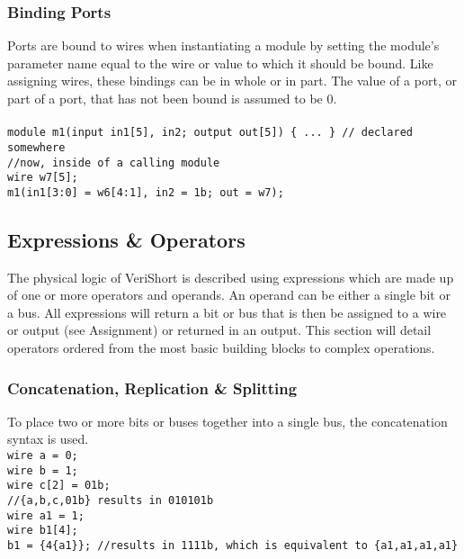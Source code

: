 \documentclass[letterpaper,11pt]{article}
\begin{document}
        \subsubsection{Binding Ports}
        Ports are bound to wires when instantiating a module by setting the module’s parameter name 
        equal to the wire or value to which it should be bound. Like assigning wires, these bindings 
        can be in whole or in part. The value of a port, or part of a port, that has not been bound 
        is assumed to be 0. \\\\
        \texttt{module m1(input in1[5], in2; output out[5]) \{ ... \} // declared somewhere} \\
        \texttt{\slash\slash now, inside of a calling module} \\
        \texttt{wire w7[5];} \\
        \texttt{m1(in1[3:0] = w6[4:1], in2 = 1b; out = w7);}
    
    \subsection{Expressions \& Operators}
    The physical logic of VeriShort is described using expressions which are made up of one 
    or more operators and operands. An operand can be either a single bit or a bus. 
    All expressions will return a bit or bus that is then be assigned to a wire or output 
    (see Assignment) or returned in an output. This section will detail operators ordered from the 
    most basic building blocks to complex operations.
    
        \subsubsection{Concatenation, Replication \& Splitting}
        To place two or more bits or buses together into a single bus, the concatenation syntax is used. \\
        \texttt{wire a = 0;} \\
        \texttt{wire b = 1;} \\
        \texttt{wire c[2] = 01b;} \\
        \texttt{//\{a,b,c,01b\} results in 010101b} \\
        \texttt{wire a1 = 1;} \\
        \texttt{wire b1[4];} \\
        \texttt{b1 = \{4\{a1\}\}; \slash\slash results in 1111b, which is equivalent to \{a1,a1,a1,a1\}} \\
        
\end{document}

